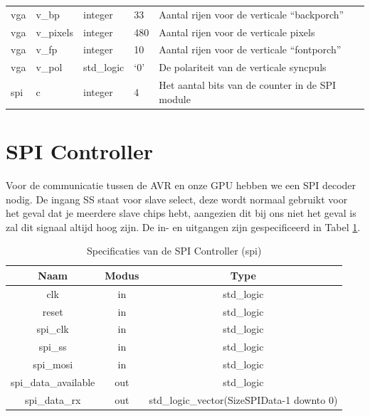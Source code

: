 \documentclass{scrreprt} %
\begin{document}
\begin{table}[H]
\begin{tabular}{l l l l l}
	vga & v\_bp & integer & 33 & Aantal rijen voor de verticale “backporch” \\ 
	vga & v\_pixels & integer & 480 & Aantal rijen voor de verticale pixels\\ 
	vga & v\_fp & integer & 10 & Aantal rijen voor de verticale “fontporch” \\ 
	vga & v\_pol & std\_logic & ‘0’ & De polariteit van de verticale syncpuls\\ 
	spi & c & integer & 4 & Het aantal bits van de counter in de SPI module\\
  	\hline
\end{tabular}
\end{table}

\section{SPI Controller}
Voor de communicatie tussen de AVR en onze GPU hebben we een SPI decoder nodig.
De ingang SS staat voor slave select, deze wordt normaal gebruikt voor het geval dat je meerdere slave chips hebt, aangezien dit bij ons niet het geval is zal dit signaal altijd hoog zijn.
De in- en uitgangen zijn gespecificeerd in Tabel \ref{tab:spec-spi}.

\begin{table}[H]
\centering
\caption{Specificaties van de SPI Controller (spi)}
\label{tab:spec-spi}
\begin{tabular}{c c c}
	\hline\hline
 	Naam & Modus & Type\\
 	\hline
	clk & in & std\_logic \\
	reset & in & std\_logic \\
	spi\_clk & in & std\_logic \\
	spi\_ss & in & std\_logic \\
	spi\_mosi & in & std\_logic \\
	spi\_data\_available & out & std\_logic \\
	spi\_data\_rx & out & std\_logic\_vector(SizeSPIData-1 downto 0) \\
  	\hline
\end{tabular}
\end{table}
\end{document}
